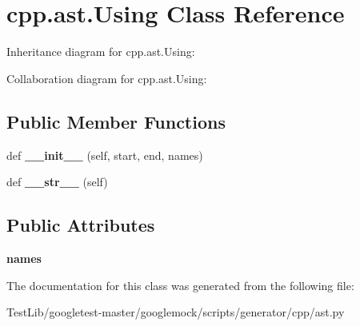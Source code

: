 \hypertarget{classcpp_1_1ast_1_1Using}{}\section{cpp.\+ast.\+Using Class Reference}
\label{classcpp_1_1ast_1_1Using}


Inheritance diagram for cpp.\+ast.\+Using\+:


Collaboration diagram for cpp.\+ast.\+Using\+:
\subsection*{Public Member Functions}
\begin{DoxyCompactItemize}
\item 
\mbox{\label{classcpp_1_1ast_1_1Using_a9b7a760a06d00f7211c889d9841e06af}} 
def {\bfseries \+\_\+\+\_\+init\+\_\+\+\_\+} (self, start, end, names)
\item 
\mbox{\label{classcpp_1_1ast_1_1Using_ac209e8e5d84988d14a8f4b30377e5455}} 
def {\bfseries \+\_\+\+\_\+str\+\_\+\+\_\+} (self)
\end{DoxyCompactItemize}
\subsection*{Public Attributes}
\begin{DoxyCompactItemize}
\item 
\mbox{\label{classcpp_1_1ast_1_1Using_abc05dedb59eb83857d373cc0e64eccb3}} 
{\bfseries names}
\end{DoxyCompactItemize}


The documentation for this class was generated from the following file\+:\begin{DoxyCompactItemize}
\item 
Test\+Lib/googletest-\/master/googlemock/scripts/generator/cpp/ast.\+py\end{DoxyCompactItemize}
